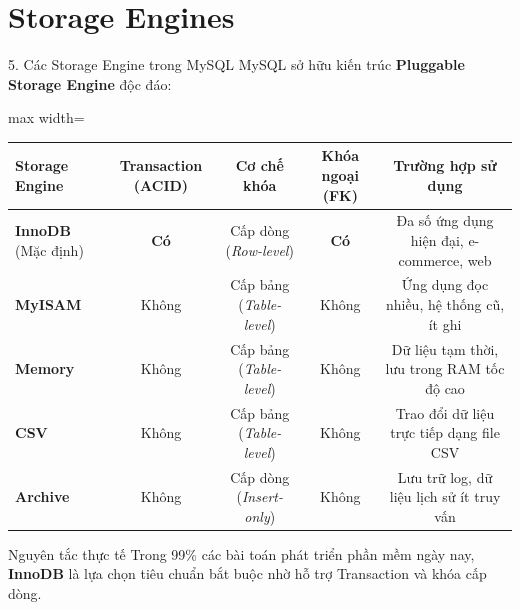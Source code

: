 \documentclass[aspectratio=169,11pt]{beamer}
\newcommand{\kw}[1]{\textcolor{dbblue}{\textbf{#1}}}
\newcommand{\smallgap}{\vspace{0.25em}}
\begin{document}
\section{Storage Engines}
\begin{frame}{5. Các Storage Engine trong MySQL}
MySQL sở hữu kiến trúc \kw{Pluggable Storage Engine} độc đáo:
\smallgap
\centering
\begin{adjustbox}{max width=\textwidth}
\begin{tabular}{lcccc}
\toprule
\textbf{Storage Engine} & \textbf{Transaction (ACID)} & \textbf{Cơ chế khóa} & \textbf{Khóa ngoại (FK)} & \textbf{Trường hợp sử dụng} \\
\midrule
\kw{InnoDB} (Mặc định) & \textbf{Có} & Cấp dòng (\textit{Row-level}) & \textbf{Có} & Đa số ứng dụng hiện đại, e-commerce, web \\
\kw{MyISAM} & Không & Cấp bảng (\textit{Table-level}) & Không & Ứng dụng đọc nhiều, hệ thống cũ, ít ghi \\
\kw{Memory} & Không & Cấp bảng (\textit{Table-level}) & Không & Dữ liệu tạm thời, lưu trong RAM tốc độ cao \\
\kw{CSV} & Không & Cấp bảng (\textit{Table-level}) & Không & Trao đổi dữ liệu trực tiếp dạng file CSV \\
\kw{Archive} & Không & Cấp dòng (\textit{Insert-only}) & Không & Lưu trữ log, dữ liệu lịch sử ít truy vấn \\
\bottomrule
\end{tabular}
\end{adjustbox}

\smallgap
\begin{exampleblock}{Nguyên tắc thực tế}
  Trong 99\% các bài toán phát triển phần mềm ngày nay, \kw{InnoDB} là lựa chọn tiêu chuẩn bắt buộc nhờ hỗ trợ Transaction và khóa cấp dòng.
\end{exampleblock}
\end{frame}

\end{document}
